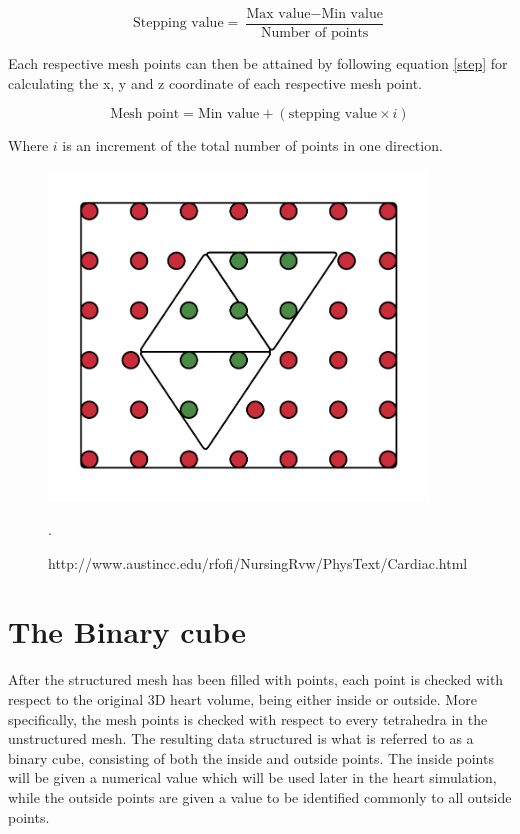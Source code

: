 \begin{equation} \label{step}
\textrm{Stepping value} = \frac{\textrm{Max value} - \textrm{Min value}}{\textrm{Number of points}} 
\end{equation}

Each respective mesh points can then be attained by following equation \ref{step} for calculating the x, y and z coordinate of each respective mesh point.

\begin{equation} \label{step}
\textrm{Mesh point} = \textrm{Min value} + (\textrm{stepping value} \times i)
\end{equation}

Where \(i\) is an increment of the total number of points in one direction. 


\begin{figure}[h]
 \centering 
     \includegraphics[width=0.9\textwidth]{bilder/m_points_inside}
     \caption{http://www.austincc.edu/rfofi/NursingRvw/PhysText/Cardiac.html}.
     \label{m_points_inside.png}
\end{figure}


\section{The Binary cube}
After the structured mesh has been filled with points, each point is checked with respect to the original 3D heart volume, being either inside or outside. More specifically, the mesh points is checked with respect to every tetrahedra in the unstructured mesh. The resulting data structured is what is referred to as a binary cube, consisting of both the inside and outside points. The inside points will be given a numerical value which will be used later in the heart simulation, while the outside points are given a value to be identified commonly to all outside points.

